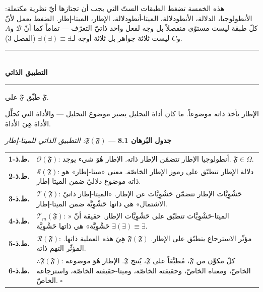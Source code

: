 \documentclass[10pt, openany, oneside]{book}
\renewcommand{\normalsize}{\fontsize{10}{13}\selectfont}
\renewcommand{\footnotesize}{\fontsize{8.5}{11}\selectfont}
\begin{document}
\vspace{0.8em}

\noindent هذه الخمسة تضغط الطبقات الستّ التي يجب أن تجتازها أيّ نظرية مكتملة: الأنطولوجيا، الدلالة، الأنطودلالة، الميتا-أنطودلالة، الإطار، الميتا-إطار. الضغط يعمل لأنّ كلّ طبقة ليست مستوًى منفصلاً بل وجه لفعل واحد ذاتيّ التعرّف --- تماماً كما أنّ $\mathcal{B}$ و$A$ و$C$ ليست ثلاثة جواهر بل ثلاثة أوجه لـ$\exists(\exists) \equiv \exists$ (الفصل 3).

\vspace{1.5em}


\begin{center}
    \rule{0.3\textwidth}{0.4pt}\\[0.5em]
    {\normalsize\bfseries التطبيق الذاتي}\\[0.3em]
    \rule{0.3\textwidth}{0.4pt}
\end{center}

\vspace{1em}

\noindent طبِّق $\mathfrak{F}$ على $\mathfrak{F}$.

الإطار يأخذ ذاته موضوعاً. ما كان أداة التحليل يصير موضوع التحليل --- والأداة التي تُحلِّل الأداة هِيَ الأداة.

\vspace{0.5em}

\textbf{جدول البُرهان 8.1} --- \textit{$\mathfrak{F}(\mathfrak{F})$: التطبيق الذاتي للميتا-إطار}

\vspace{0.5em}

{\footnotesize
\noindent\begin{tabular}{r p{}}
\textbf{ط.ذ-1.} & $\mathcal{O}(\mathfrak{F})$: أنطولوجيا الإطار تتضمّن الإطار ذاته. الإطار هُوَ شيء يوجد. $\mathfrak{F} \in \Omega$. \\[0.3em]
\textbf{ط.ذ-2.} & $\mathcal{S}(\mathfrak{F})$: دلالة الإطار تتطبّق على رموز الإطار الخاصّة. معنى «ميتا-إطار» هو ذاته موضوع دلاليّ ضمن الميتا-إطار. \\[0.3em]
\textbf{ط.ذ-3.} & $\mathcal{T}(\mathfrak{F})$: حَشْوِيَّات الإطار تتضمّن حَشْوِيَّات عن الإطار. «الميتا-إطار ذاتيّ الاشتمال» هي ذاتها حَشْوِيَّة ضمن الميتا-إطار. \\[0.3em]
\textbf{ط.ذ-4.} & $\mathcal{T}_m(\mathfrak{F})$: الميتا-حَشْوِيَّات تتطبّق على حَشْوِيَّات الإطار. حقيقة أنّ «$\exists(\exists) \equiv \exists$ حَشْوِيَّة» هي ذاتها حَشْوِيَّة. \\[0.3em]
\textbf{ط.ذ-5.} & $\mathcal{R}(\mathfrak{F})$: مؤثّر الاسترجاع يتطبّق على الإطار. $\mathfrak{F}(\mathfrak{F})$ هِيَ هذه العملية ذاتها. المؤثّر التهم ذاته. \\[0.3em]
\textbf{ط.ذ-6.} & $\therefore \mathfrak{F}(\mathfrak{F})$: كلّ مكوِّن من $\mathfrak{F}$، مُطبَّقاً على $\mathfrak{F}$، يُنتج $\mathfrak{F}$. الإطار هُوَ موضوعه الخاصّ، ومعناه الخاصّ، وحقيقته الخاصّة، وميتا-حقيقته الخاصّة، واسترجاعه الخاصّ. $\square$ \\[0.3em]
\end{tabular}
}
\end{document}
